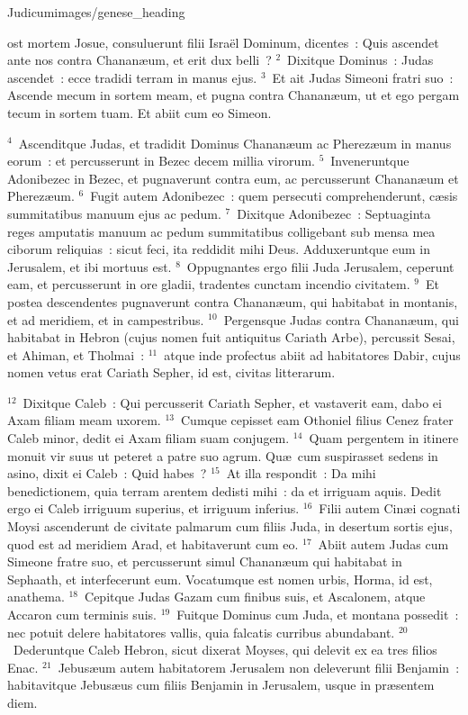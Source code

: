 {Judicum}{images/genese_heading}


\bchapter
{}ost mortem Josue, consuluerunt filii Isra\"el Dominum, dicentes~: Quis ascendet ante nos contra Chanan\ae um, et erit dux belli~?
${}^{2}$~Dixitque Dominus~: Judas ascendet~: ecce tradidi terram in manus ejus.
${}^{3}$~Et ait Judas Simeoni fratri suo~: Ascende mecum in sortem meam, et pugna contra Chanan\ae um, ut et ego pergam tecum in sortem tuam. Et abiit cum eo Simeon.


${}^{4}$~Ascenditque Judas, et tradidit Dominus Chanan\ae um ac Pherez\ae um in manus eorum~: et percusserunt in Bezec decem millia virorum.
${}^{5}$~Inveneruntque Adonibezec in Bezec, et pugnaverunt contra eum, ac percusserunt Chanan\ae um et Pherez\ae um.
${}^{6}$~Fugit autem Adonibezec~: quem persecuti comprehenderunt, c\ae sis summitatibus manuum ejus ac pedum.
${}^{7}$~Dixitque Adonibezec~: Septuaginta reges amputatis manuum ac pedum summitatibus colligebant sub mensa mea ciborum reliquias~: sicut feci, ita reddidit mihi Deus. Adduxeruntque eum in Jerusalem, et ibi mortuus est.
${}^{8}$~Oppugnantes ergo filii Juda Jerusalem, ceperunt eam, et percusserunt in ore gladii, tradentes cunctam incendio civitatem.
${}^{9}$~Et postea descendentes pugnaverunt contra Chanan\ae um, qui habitabat in montanis, et ad meridiem, et in campestribus.
${}^{10}$~Pergensque Judas contra Chanan\ae um, qui habitabat in Hebron (cujus nomen fuit antiquitus Cariath Arbe), percussit Sesai, et Ahiman, et Tholmai~:
${}^{11}$~atque inde profectus abiit ad habitatores Dabir, cujus nomen vetus erat Cariath Sepher, id est, civitas litterarum.


${}^{12}$~Dixitque Caleb~: Qui percusserit Cariath Sepher, et vastaverit eam, dabo ei Axam filiam meam uxorem.
${}^{13}$~Cumque cepisset eam Othoniel filius Cenez frater Caleb minor, dedit ei Axam filiam suam conjugem.
${}^{14}$~Quam pergentem in itinere monuit vir suus ut peteret a patre suo agrum. Qu\ae\ cum suspirasset sedens in asino, dixit ei Caleb~: Quid habes~?
${}^{15}$~At illa respondit~: Da mihi benedictionem, quia terram arentem dedisti mihi~: da et irriguam aquis. Dedit ergo ei Caleb irriguum superius, et irriguum inferius.
${}^{16}$~Filii autem Cin\ae i cognati Moysi ascenderunt de civitate palmarum cum filiis Juda, in desertum sortis ejus, quod est ad meridiem Arad, et habitaverunt cum eo.
${}^{17}$~Abiit autem Judas cum Simeone fratre suo, et percusserunt simul Chanan\ae um qui habitabat in Sephaath, et interfecerunt eum. Vocatumque est nomen urbis, Horma, id est, anathema.
${}^{18}$~Cepitque Judas Gazam cum finibus suis, et Ascalonem, atque Accaron cum terminis suis.
${}^{19}$~Fuitque Dominus cum Juda, et montana possedit~: nec potuit delere habitatores vallis, quia falcatis curribus abundabant.
${}^{20}$~Dederuntque Caleb Hebron, sicut dixerat Moyses, qui delevit ex ea tres filios Enac.
${}^{21}$~Jebus\ae um autem habitatorem Jerusalem non deleverunt filii Benjamin~: habitavitque Jebus\ae us cum filiis Benjamin in Jerusalem, usque in pr\ae sentem diem.


